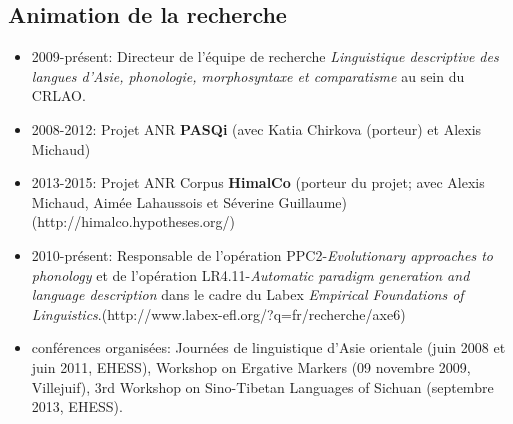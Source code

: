 \documentclass[oldfontcommands,oneside,a4paper,11pt]{article}
\begin{document}
\subsection*{Animation de la recherche}
\begin{itemize}
\item 2009-présent: Directeur de l'équipe de recherche \textit{Linguistique descriptive des langues d’Asie, phonologie, morphosyntaxe et comparatisme} au sein du CRLAO.
\item 2008-2012: Projet ANR \textbf{PASQi} (avec Katia Chirkova (porteur) et Alexis Michaud) 
\item  2013-2015: Projet ANR Corpus \textbf{HimalCo} (porteur du projet; avec Alexis Michaud, Aimée Lahaussois et Séverine Guillaume) ({\color{blue}http://himalco.hypotheses.org/})
\item 2010-présent: Responsable de l'opération PPC2-\textit{Evolutionary approaches to phonology} et de l'opération LR4.11-\textit{Automatic paradigm generation and language description} dans le cadre du Labex \textit{Empirical Foundations of Linguistics}.({\color{blue}http://www.labex-efl.org/?q=fr/recherche/axe6})
\item conférences organisées: Journées de linguistique d'Asie orientale (juin 2008 et juin 2011, EHESS),  Workshop on Ergative Markers (09 novembre 2009, Villejuif), 3rd Workshop on Sino-Tibetan Languages of Sichuan (septembre 2013, EHESS).
\end{itemize}
  
\end{document}
